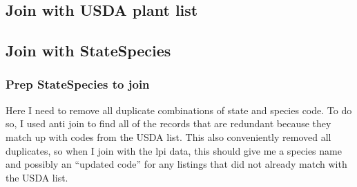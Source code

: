 \documentclass[
]{book}
\newenvironment{Shaded}{\begin{snugshade}}{\end{snugshade}}
\newcommand{\CommentTok}[1]{\textcolor[rgb]{0.56,0.35,0.01}{\textit{#1}}}
\newcommand{\DataTypeTok}[1]{\textcolor[rgb]{0.13,0.29,0.53}{#1}}
\newcommand{\KeywordTok}[1]{\textcolor[rgb]{0.13,0.29,0.53}{\textbf{#1}}}
\newcommand{\NormalTok}[1]{#1}
\newcommand{\OperatorTok}[1]{\textcolor[rgb]{0.81,0.36,0.00}{\textbf{#1}}}
\newcommand{\StringTok}[1]{\textcolor[rgb]{0.31,0.60,0.02}{#1}}
\begin{document}
\hypertarget{join-with-usda-plant-list}{%
\subsection{Join with USDA plant list}\label{join-with-usda-plant-list}}

\begin{Shaded}
\end{Shaded}

\hypertarget{join-with-statespecies}{%
\subsection{Join with StateSpecies}\label{join-with-statespecies}}

\hypertarget{prep-statespecies-to-join}{%
\subsubsection{Prep StateSpecies to join}\label{prep-statespecies-to-join}}

Here I need to remove all duplicate combinations of state and species code. To do so, I used anti join to find all of the records that are redundant because they match up with codes from the USDA list. This also conveniently removed all duplicates, so when I join with the lpi data, this should give me a species name and possibly an ``updated code'' for any listings that did not already match with the USDA list.
\end{document}
